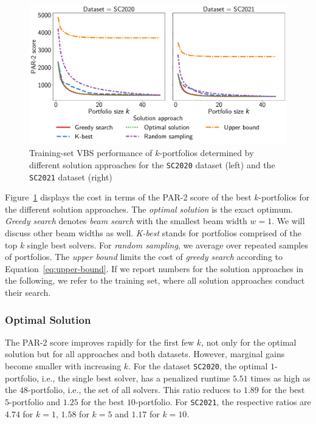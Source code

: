 \documentclass[a4paper,USenglish,pdfa]{lipics-v2021} %
\begin{document}
\begin{figure}[tb]
	\centering
	\includegraphics[width=\columnwidth, trim={0 15 0 0}, clip]{plots/search-train-objective.pdf}
	\caption{Training-set VBS performance of $k$-portfolios determined by different solution approaches for the \texttt{SC2020} dataset (left) and the \texttt{SC2021} dataset (right)}
	\label{fig:search-train-objective}
\end{figure}

Figure~\ref{fig:search-train-objective} displays the cost in terms of the PAR-2 score of the best $k$-portfolios for the different solution approaches. 
The \emph{optimal solution} is the exact optimum.
\emph{Greedy search} denotes \emph{beam search} with the smallest beam width $w=1$. 
We will discuss other beam widths as well.
\emph{K-best} stands for portfolios comprised of the top $k$ single best solvers. 
For \emph{random sampling}, we average over repeated samples of portfolios.
The \emph{upper bound} limits the cost of \emph{greedy search} according to Equation~\ref{eq:upper-bound}.
If we report numbers for the solution approaches in the following, we refer to the training set, where all solution approaches conduct their search.

\subsubsection{Optimal Solution}

The PAR-2 score improves rapidly for the first few $k$, not only for the optimal solution but for all approaches and both datasets.
However, marginal gains become smaller with increasing $k$.
For the dataset \texttt{SC2020}, the optimal $1$-portfolio, i.e., the single best solver, has a penalized runtime $5.51$ times as high as the $48$-portfolio, i.e., the set of all solvers.
This ratio reduces to $1.89$ for the best $5$-portfolio and $1.25$ for the best $10$-portfolio.
For \texttt{SC2021}, the respective ratios are $4.74$ for $k=1$, $1.58$ for $k=5$ and $1.17$ for $k=10$.
\end{document}
